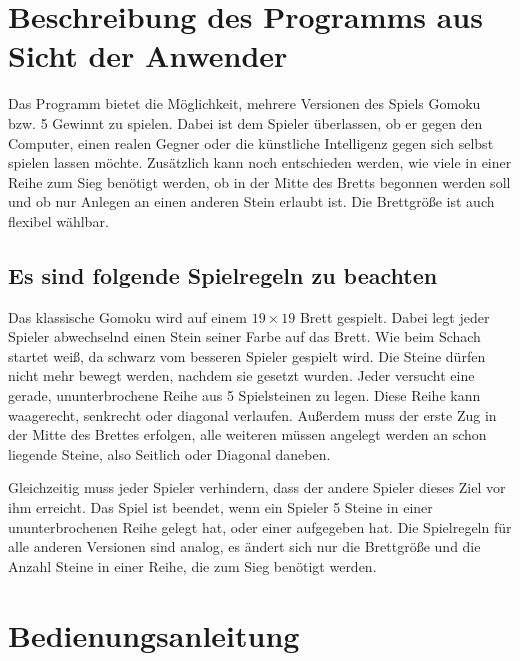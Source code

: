 \documentclass[11pt]{article}
\newcommand{\1}{{\mathds{1}}}
\begin{document}
	\pagestyle{fancy}

	\arraycolsep=1.0pt

	\section*{Beschreibung des Programms aus Sicht der Anwender}
	
	Das Programm bietet die Möglichkeit, mehrere Versionen des Spiels Gomoku bzw. 5 Gewinnt zu spielen.
	Dabei ist dem Spieler überlassen, ob er gegen den Computer, einen realen Gegner oder die künstliche Intelligenz gegen sich selbst spielen lassen möchte.
	Zusätzlich kann noch entschieden werden, wie viele in einer Reihe zum Sieg benötigt werden, 
	ob in der Mitte des Bretts begonnen werden soll und ob nur Anlegen an einen anderen Stein erlaubt ist.
	Die Brettgröße ist auch flexibel wählbar.
	
	\subsection*{Es sind folgende Spielregeln zu beachten}
	Das klassische Gomoku wird auf einem $19 \times 19$ Brett gespielt.
	Dabei legt jeder Spieler abwechselnd einen Stein seiner Farbe auf das Brett.
	Wie beim Schach startet weiß, da schwarz vom besseren Spieler gespielt wird.
	Die Steine dürfen nicht mehr bewegt werden, nachdem sie gesetzt wurden.
	Jeder versucht eine gerade, ununterbrochene Reihe aus 5 Spielsteinen zu legen.
	Diese Reihe kann waagerecht, senkrecht oder diagonal verlaufen. 
	Außerdem muss der erste Zug in der Mitte des Brettes erfolgen, alle weiteren müssen angelegt werden an schon liegende Steine, also Seitlich oder Diagonal daneben.
	
	Gleichzeitig muss jeder Spieler verhindern, dass der andere Spieler dieses Ziel vor ihm erreicht.
	Das Spiel ist beendet, wenn ein Spieler 5 Steine in einer ununterbrochenen Reihe gelegt hat, oder einer aufgegeben hat.
	Die Spielregeln für alle anderen Versionen sind analog, es ändert sich nur die Brettgröße und die Anzahl Steine in einer Reihe, die zum Sieg benötigt werden. 
	
	
	\section*{Bedienungsanleitung}
	
\end{document}
